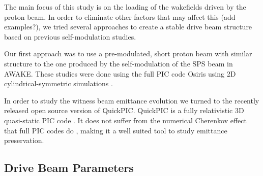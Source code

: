 \documentclass[aps,prstab,reprint,amsmath,amssymb,groupedaddress]{revtex4-1}
\begin{document}
The main focus of this study is on the loading of the wakefields driven by the proton beam. In order to eliminate other
factors that may affect this (add examples?), we tried several approaches to create a stable drive beam structure based
on previous self-modulation studies.

Our first approach was to use a pre-modulated, short proton beam with similar structure to the one produced by the
self-modulation of the SPS beam in AWAKE. These studies were done using the full PIC code Osiris \cite{fonseca:2002}
using 2D cylindrical-symmetric simulations \cite{berglyd_olsen:2015, berglyd_olsen:2016}.


In order to study the witness beam emittance evolution we turned to the recently released open source version of
QuickPIC. QuickPIC is a fully relativistic 3D quasi-static PIC code \cite{huang:2006, an:2013}. It does not suffer from
the numerical Cherenkov effect that full PIC codes do \cite{godfrey:1974,lehe:2013}, making it a well suited tool to
study emittance preservation.

\subsection[\label{S:M:Setup}]{Drive Beam Parameters}
\end{document}
